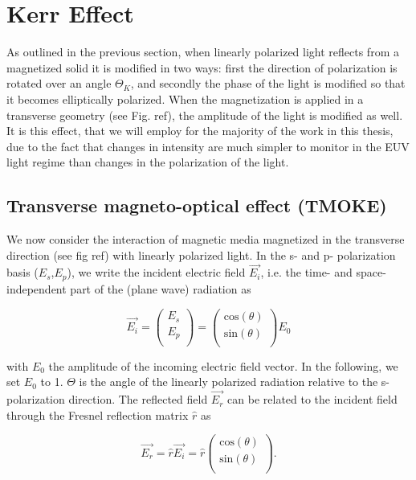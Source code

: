 \section{Kerr Effect}

As outlined in the previous section, when linearly polarized light reflects from a magnetized solid it is modified in two ways: first the direction of polarization is rotated over an angle $\Theta_K$, and secondly the phase of the light is modified so that it becomes elliptically polarized. When the magnetization is applied in a transverse geometry (see Fig. ref), the amplitude of the light is modified as well. It is this effect, that we will employ for the majority of the work in this thesis, due to the fact that changes in intensity are much simpler to monitor in the EUV light regime than changes in the polarization of the light.

\subsection{Transverse magneto-optical effect (TMOKE)}
 
We now consider the interaction of magnetic media magnetized in the transverse direction (see fig ref) with linearly polarized light. In the s- and p- polarization basis ($E_s$,$E_p$), we write the incident electric field $\vec{E_i}$, i.e. the time- and space- independent part of the (plane wave) radiation as

\begin{equation}
\overrightarrow{E_i} = \left({\begin{array}{c}
	E_s \\
	E_p \\
	\end{array} } \right) 
= \left({\begin{array}{c}
	\text{cos}(\theta) \\
	\text{sin}(\theta) \\
	\end{array} } \right) E_0
\end{equation}

with $E_0$ the amplitude of the incoming electric field vector. In the following, we set $E_0$ to 1. $\Theta$ is the angle of the linearly polarized radiation relative to the s-polarization direction. The reflected field $\overrightarrow{E_r}$ can be related to the incident field through the Fresnel reflection matrix $\hat{r}$ as

\begin{equation}
\overrightarrow{E_r} = \hat{r}\overrightarrow{E_i}=\hat{r}\left({\begin{array}{c}
	\text{cos}(\theta) \\
	\text{sin}(\theta) \\
	\end{array} } \right) .
\end{equation}

